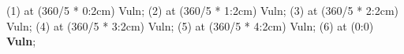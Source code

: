  (1) at (360/5 * 0:2cm) {\small Vuln};
 (2) at (360/5 * 1:2cm) {\small Vuln};
 (3) at (360/5 * 2:2cm) {\small Vuln};
 (4) at (360/5 * 3:2cm) {\small Vuln};
 (5) at (360/5 * 4:2cm) {\small Vuln};
 (6) at (0:0) {\textbf{\small Vuln}};


